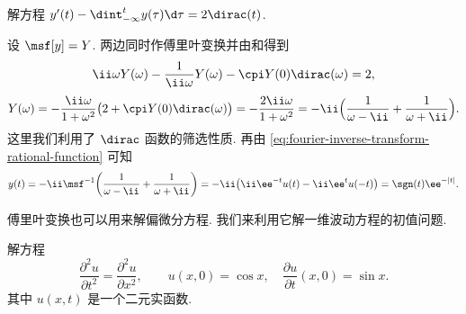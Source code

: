 \begin{example}
  解方程 $y'(t)-\dint_{-\infty}^t y(\tau)\d \tau=2\dirac(t)$.
\end{example}

\begin{solution}
  设 $\msf[y]=Y$.
  两边同时作傅里叶变换并由\thmFDif 和\thmFInt 得到
  \[
    \ii \omega Y(\omega)-\frac1{\ii \omega}Y(\omega)
    -\cpi Y(0)\dirac(\omega)=2,
  \]
  \begin{align*}
     Y(\omega)
    =-\frac{\ii \omega}{1+\omega^2}\bigl(2+\cpi Y(0)\dirac(\omega)\bigr)
    =-\frac{2\ii \omega}{1+\omega^2}
    =-\ii\Bigl(\frac1{\omega-\ii}+\frac1{\omega+\ii}\Bigr).
  \end{align*}
  这里我们利用了 $\dirac$ 函数的筛选性质.
  再由 \ref{eq:fourier-inverse-transform-rational-function} 可知
  \[
     y(t)
    =-\ii\msf^{-1}\biggl(\frac1{\omega-\ii}+\frac1{\omega+\ii}\biggr)
    =-\ii\bigl(\ii \ee^{-t}u(t)-\ii \ee^tu(-t)\bigr)
    =\sgn(t)\ee^{-|t|}.
  \]
\end{solution}

傅里叶变换也可以用来解偏微分方程.
我们来利用它解一维波动方程的初值问题.

\begin{example}
  解方程
  \[
     \dfrac{\partial^2 u}{\partial t^2}
    =\dfrac{\partial^2u}{\partial x^2},\qquad
     u(x,0)=\cos x,\quad
     \dfrac{\partial u}{\partial t}(x,0)=\sin x.
  \]
  其中 $u(x,t)$ 是一个二元实函数.
\end{example}

